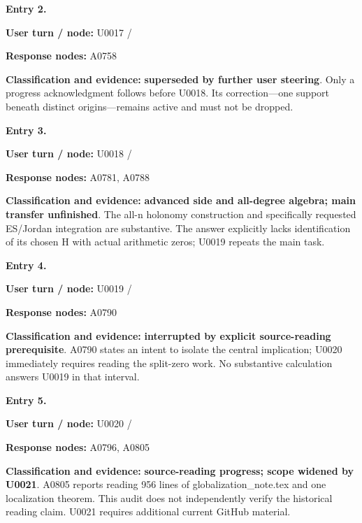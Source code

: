 \documentclass[10pt,a4paper,oneside]{report}
\begin{document}

\textbf{Entry 2.}

\textbf{User turn / node:} U0017 /
\protect{}

\textbf{Response nodes:} A0758

\textbf{Classification and evidence:} \textbf{superseded by further user
steering}. Only a progress acknowledgment follows before U0018. Its
correction---one support beneath distinct origins---remains active and
must not be dropped.


\textbf{Entry 3.}

\textbf{User turn / node:} U0018 /
\protect{}

\textbf{Response nodes:} A0781, A0788

\textbf{Classification and evidence:} \textbf{advanced side and
all-degree algebra; main transfer unfinished}. The all-n holonomy
construction and specifically requested ES/Jordan integration are
substantive. The answer explicitly lacks identification of its chosen H
with actual arithmetic zeros; U0019 repeats the main task.


\textbf{Entry 4.}

\textbf{User turn / node:} U0019 /
\protect{}

\textbf{Response nodes:} A0790

\textbf{Classification and evidence:} \textbf{interrupted by explicit
source-reading prerequisite}. A0790 states an intent to isolate the
central implication; U0020 immediately requires reading the split-zero
work. No substantive calculation answers U0019 in that interval.


\textbf{Entry 5.}

\textbf{User turn / node:} U0020 /
\protect{}

\textbf{Response nodes:} A0796, A0805

\textbf{Classification and evidence:} \textbf{source-reading progress;
scope widened by U0021}. A0805 reports reading 956 lines of
globalization\_note.tex and one localization theorem. This audit does
not independently verify the historical reading claim. U0021 requires
additional current GitHub material.
\end{document}
